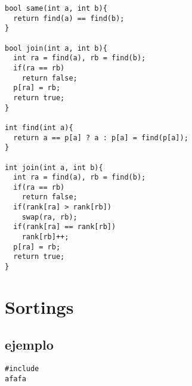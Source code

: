 \documentclass[twoside]{article}
\begin{document}
\begin{multicols*}{2}
\begin{verbatim}
bool same(int a, int b){
  return find(a) == find(b);
}

bool join(int a, int b){
  int ra = find(a), rb = find(b);
  if(ra == rb)
    return false;
  p[ra] = rb;
  return true;
}

int find(int a){
  return a == p[a] ? a : p[a] = find(p[a]);
}

int join(int a, int b){
  int ra = find(a), rb = find(b);
  if(ra == rb)
    return false;
  if(rank[ra] > rank[rb])
    swap(ra, rb);
  if(rank[ra] == rank[rb])
    rank[rb]++;
  p[ra] = rb;
  return true;
}

\end{verbatim}

{
[\vspace{2em}]
\section*{Sortings}
}
{
\subsection*{ejemplo}
}
\begin{verbatim}
#include
afafa

\end{verbatim}

\end{multicols*}
\end{document}
